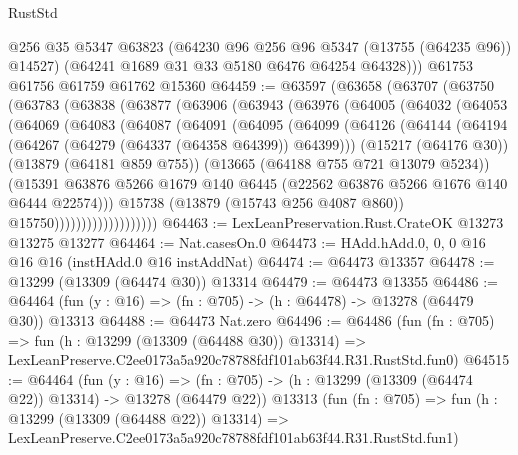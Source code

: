\begin{lexlean}{RustStd}
\begin{coremodule}
        @256
        @35
        @5347
        @63823
        (@64230 @96 @256 @96 @5347 (@13755 (@64235 @96)) @14527)
        (@64241 @1689 @31 @33 @5180 @6476 @64254 @64328)))
    @61753
    @61756
    @61759
    @61762
    @15360
@64459 := @63597
    (@63658
      (@63707
        (@63750
          (@63783
            (@63838
              (@63877
                (@63906
                  (@63943
                    (@63976
                      (@64005
                        (@64032
                          (@64053
                            (@64069
                              (@64083
                                (@64087
                                  (@64091
                                    (@64095
                                      (@64099
                                        (@64126
                                          (@64144
                                            (@64194
                                              (@64267 (@64279 (@64337 (@64358 @64399)) @64399)))
                                            (@15217 (@64176 @30))
                                            (@13879 (@64181 @859 @755))
                                            (@13665 (@64188 @755 @721 @13079 @5234))
                                            (@15391
                                              @63876
                                              @5266
                                              @1679
                                              @140
                                              @6445
                                              (@22562 @63876 @5266 @1676 @140 @6444 @22574)))
                                          @15738
                                          (@13879 (@15743 @256 @4087 @860))
                                          @15750)))))))))))))))))))
@64463 := LexLeanPreservation.Rust.CrateOK @13273 @13275 @13277
@64464 := Nat.casesOn.{0}
@64473 := HAdd.hAdd.{0, 0, 0} @16 @16 @16 (instHAdd.{0} @16 instAddNat)
@64474 := @64473 @13357
@64478 := @13299 (@13309 (@64474 @30)) @13314
@64479 := @64473 @13355
@64486 := @64464 (fun (y : @16) => (fn : @705) -> (h : @64478) -> @13278 (@64479 @30)) @13313
@64488 := @64473 Nat.zero
@64496 := @64486
    (fun (fn : @705) =>
    fun (h : @13299 (@13309 (@64488 @30)) @13314) =>
    LexLeanPreserve.C2ee0173a5a920c78788fdf101ab63f44.R31.RustStd.fun0)
@64515 := @64464
    (fun (y : @16) =>
    (fn : @705) -> (h : @13299 (@13309 (@64474 @22)) @13314) -> @13278 (@64479 @22))
    @13313
    (fun (fn : @705) =>
    fun (h : @13299 (@13309 (@64488 @22)) @13314) =>
    LexLeanPreserve.C2ee0173a5a920c78788fdf101ab63f44.R31.RustStd.fun1)

\end{coremodule}
\end{lexlean}
